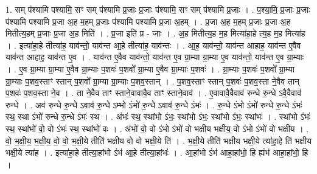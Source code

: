 \documentclass[17pt]{extarticle}
\begin{document}
1. सम् प॑श्यामि पश्यामि॒ सꣳ सम् प॑श्यामि प्र॒जाः प्र॒जाः प॑श्यामि॒ सꣳ सम् प॑श्यामि प्र॒जाः । . प॒श्या॒मि॒ प्र॒जाः प्र॒जाः प॑श्यामि पश्यामि प्र॒जा अ॒ह म॒हम् प्र॒जाः प॑श्यामि पश्यामि प्र॒जा अ॒हम् । . प्र॒जा अ॒ह म॒हम् प्र॒जाः प्र॒जा अ॒ह मितीत्य॒हम् प्र॒जाः प्र॒जा अ॒ह मिति॑ । . प्र॒जा इति॑ प्र - जाः । . अ॒ह मितीत्य॒ह म॒ह मित्या॑हा॒हे त्य॒ह म॒ह मित्या॑ह । . इत्या॑हा॒हे तीत्या॑ह॒ याव॑न्तो॒ याव॑न्त आ॒हे तीत्या॑ह॒ याव॑न्तः । . आ॒ह॒ याव॑न्तो॒ याव॑न्त आहाह॒ याव॑न्त ए॒वैव याव॑न्त आहाह॒ याव॑न्त ए॒व । . याव॑न्त ए॒वैव याव॑न्तो॒ याव॑न्त ए॒व ग्रा॒म्या ग्रा॒म्या ए॒व याव॑न्तो॒ याव॑न्त ए॒व ग्रा॒म्याः । . ए॒व ग्रा॒म्या ग्रा॒म्या ए॒वैव ग्रा॒म्याः प॒शवः॑ प॒शवो᳚ ग्रा॒म्या ए॒वैव ग्रा॒म्याः प॒शवः॑ । . ग्रा॒म्याः प॒शवः॑ प॒शवो᳚ ग्रा॒म्या ग्रा॒म्याः प॒शव॒स्ताꣳ स्तान् प॒शवो᳚ ग्रा॒म्या ग्रा॒म्याः प॒शव॒स्तान् । . प॒शव॒स्ताꣳ स्तान् प॒शवः॑ प॒शव॒स्ता ने॒वैव तान् प॒शवः॑ प॒शव॒स्ता ने॒व । . ता ने॒वैव ताꣳ स्ताने॒वावावै॒व ताꣳ स्ताने॒वाव॑ । . ए॒वावावै॒वैवाव॑ रुन्धे रु॒न्धे ऽवै॒वैवाव॑ रुन्धे । . अव॑ रुन्धे रु॒न्धे ऽवाव॑ रु॒न्धे ऽम्भो ऽंभो॑ रु॒न्धे ऽवाव॑ रु॒न्धे ऽंभः॑ । . रु॒न्धे ऽंभो ऽंभो॑ रुन्धे रु॒न्धे ऽंभः॑ स्थ॒ स्था ऽंभो॑ रुन्धे रु॒न्धे ऽंभः॑ स्थ । . अंभः॑ स्थ॒ स्थांभो ऽंभः॒ स्थांभो ऽंभः॒ स्थांभो ऽंभः॒ स्थांभः॑ । . स्थांभो ऽंभः॑ स्थ॒ स्थांभो॑ वो॒ वो ऽंभः॑ स्थ॒ स्थांभो॑ वः । . अंभो॑ वो॒ वो ऽंभो ऽंभो॑ वो भक्षीय भक्षीय॒ वो ऽंभो ऽंभो॑ वो भक्षीय । . वो॒ भ॒क्षी॒य॒ भ॒क्षी॒य॒ वो॒ वो॒ भ॒क्षी॒ये तीति॑ भक्षीय वो वो भक्षी॒ये ति॑ । . भ॒क्षी॒ये तीति॑ भक्षीय भक्षी॒ये त्या॑हा॒हे ति॑ भक्षीय भक्षी॒ये त्या॑ह । . इत्या॑हा॒हे तीत्या॒हांभो ऽंभ॑ आ॒हे तीत्या॒हांभः॑ । . आ॒हांभो ऽंभ॑ आहा॒हांभो॒ हि ह्यंभ॑ आहा॒हांभो॒ हि । \newline
\end{document}
